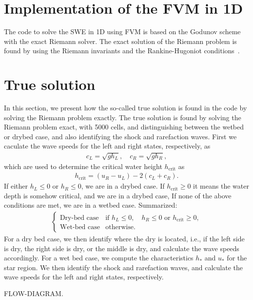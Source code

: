 \section{Implementation of the FVM in 1D}
The code to solve the SWE in 1D using FVM is based on the Godunov scheme with the exact Riemann solver.
The exact solution of the Riemann problem is found by using the Riemann invariants and the Rankine-Hugoniot conditions~\cite{trento_course}.


\section{True solution}
In this section, we present how the so-called true solution is found in the code by solving the Riemann problem exactly.
The true solution is found by solving the Riemann problem exact, with 5000 cells, and distinguishing between the wetbed or drybed case, and also identifying the shock and rarefaction waves.
First we caculate the wave speeds for the left and right states, respectively, as
\begin{align*}
    c_L = \sqrt{g h_L}, \quad c_R = \sqrt{g h_R},
\end{align*}
which are used to determine the critical water height $h_{\text{crit}}$ as
\begin{align*}
    h_{\text{crit}} = (u_R - u_L) - 2(c_L + c_R).
\end{align*}
If either $h_L \leq 0$ or $h_R \leq 0$, we are in a drybed case.
If $h_{\text{crit}} \geq 0$ it means the water depth is somehow critical, and we are in a drybed case,
If none of the above conditions are met, we are in a wetbed case.
Summarized:
\begin{align*}
    \begin{cases}
        \text{Dry-bed case} & \text{if }  h_L \leq 0, \quad  h_R \leq 0 \text{ or } h_{\text{crit}} \geq 0, \\
        \text{Wet-bed case} & \text{otherwise}.
    \end{cases}
\end{align*}
For a dry bed case, we then identify where the dry is located, i.e., if the left side is dry, the right side is dry, or the middle is dry, and calculate the wave speeds accordingly.
For a wet bed case, we compute the characteristics $h_*$ and $u_*$ for the star region.
We then identify the shock and rarefaction waves, and calculate the wave speeds for the left and right states, respectively.

FLOW-DIAGRAM.

